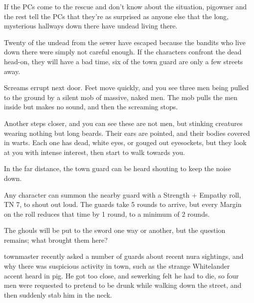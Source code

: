 \begin{multicols}{2}
If the PCs come to the rescue and don't know about the situation, \gls{pigowner} and the rest tell the PCs that they're as surprised as anyone else that the long, mysterious hallways down there have undead living there.

\stopcontents[sq]



Twenty of the undead from the sewer have escaped because the bandits who live down there were simply not careful enough.  If the characters confront the dead head-on, they will have a bad time, six of the town guard are only a few streets away.

\begin{boxtext}

	Screams errupt next door.  Feet move quickly, and you see three men being pulled to the ground by a silent mob of massive, naked men.  The mob pulls the men inside but makes no sound, and then the screaming stops.

	Another steps closer, and you can see these are not men, but stinking creatures wearing nothing but long beards.
	Their ears are pointed, and their bodies covered in warts.
	Each one has dead, white eyes, or gouged out eyesockets, but they look at you with intense interest, then start to walk towards you.

	In the far distance, the town guard can be heard shouting to keep the noise down.

\end{boxtext}

Any character can summon the nearby guard with a Strength + Empathy roll, TN 7, to shout out loud.
The guards take 5 rounds to arrive, but every Margin on the roll reduces that time by 1 round, to a minimum of 2 rounds.


The ghouls will be put to the sword one way or another, but the question remains; what brought them here?

\undeadhobgoblin


\gls{townmaster} recently asked a number of guards about recent nura sightings, and why there was suspicious activity in town, such as the strange Whitelander accent heard in \gls{pig}.
He got too close, and \gls{sewerking} felt he had to die, so four men were requested to pretend to be drunk while walking down the street, and then suddenly stab him in the neck.


\end{multicols}
